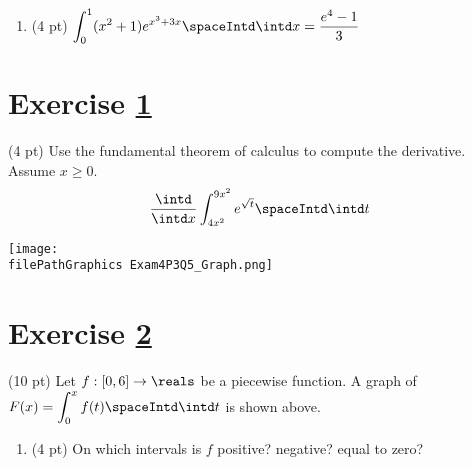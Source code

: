 


\begin{enumerate}[resume,label=(\alph*)]
\item\label{itm : Exam4P3Q3b} (4 pt) $\displaystyle\int_{0}^{1} (x^{2} + 1) e^{x^{3} + 3 x} \spaceIntd \intd x = \frac{e^{4} - 1}{3}$
\end{enumerate}

\spaceSolution{3in}{%
}%





%
%
%
%


\newpage

\section{Exercise \ref{sec : Math112 Spring2022 FinalExam P3Q4}}
\label{sec : Math112 Spring2022 FinalExam P3Q4}

(4 pt) Use the fundamental theorem of calculus to compute the derivative. Assume $x \geq 0$.
\begin{align*}
\frac{\intd}{\intd x} \int_{4 x^{2}}^{9 x^{2}} e^{\sqrt{t}} \spaceIntd \intd t
\end{align*}





%
%
%
%


\newpage

\begin{center}
\texttt{[image: \\filePathGraphics Exam4P3Q5\_Graph.png]}
\end{center}

\section{Exercise \ref{sec : Math112 Spring2022 FinalExam P3Q5}}
\label{sec : Math112 Spring2022 FinalExam P3Q5}


\noindent{}(10 pt) Let $f : [0,6] \rightarrow \reals$ be a piecewise function. A graph of $\displaystyle F(x) = \int_{0}^{x} f(t) \spaceIntd \intd t$ is shown above.

\begin{enumerate}[label=(\alph*)]
\item\label{itm : Exam4P3Q5a} (4 pt) On which intervals is $f$ positive? negative? equal to zero?
\end{enumerate}


